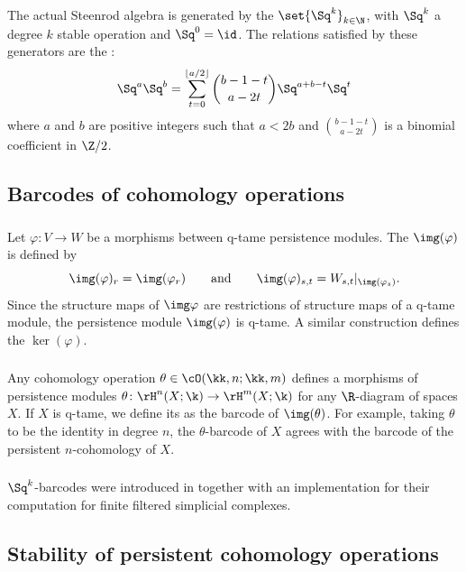 The actual Steenrod algebra is generated by the  $\set{\Sq^k}_{k \in \N}$, with $\Sq^k$ a degree $k$ stable operation and $\Sq^0 = \id$.
The relations satisfied by these generators are the :
\[
\Sq^a \Sq^b = \sum_{t = 0}^{\lfloor a/2 \rfloor} \binom{b-1-t}{a-2t} \Sq^{a+b-t} \Sq^t
\]
where $a$ and $b$ are positive integers such that $a < 2b$ and \(\binom{b-1-t}{a-2t}\) is a binomial coefficient in $\Z/2$.


\subsection{Barcodes of cohomology operations}

\subsubsection{} Let $\varphi \colon V \to W$ be a morphisms between q-tame persistence modules.
The  $\img(\varphi)$ is defined by
\[
\img(\varphi)_r = \img(\varphi_r)
\qquad\text{and}\qquad
\img(\varphi)_{s,t} = W_{s,t}|_{\img(\varphi_s)}.
\]
Since the structure maps of $\img \varphi$ are restrictions of structure maps of a q-tame module, the persistence module $\img(\varphi)$ is q-tame.
A similar construction defines the  $\ker(\varphi)$.

\subsubsection{} Any cohomology operation $\theta \in \cO(\kk,n; \kk,m)$ defines a morphisms of persistence modules $\theta \colon \rH^n(X; \k) \to \rH^m(X; \k)$ for any $\R$-diagram of spaces $X$.
If $X$ is q-tame, we define its  as the barcode of $\img(\theta)$.
For example, taking $\theta$ to be the identity in degree $n$, the $\theta$-barcode of $X$ agrees with the barcode of the persistent $n$-cohomology of $X$.

\subsubsection{} $\Sq^k$-barcodes were introduced in \cite{medina2022per_st} together with an implementation for their computation for finite filtered simplicial complexes.

\subsection{Stability of persistent cohomology operations}\label{ss:stability}


